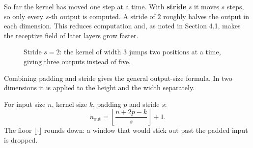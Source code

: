 \documentclass[12pt, a4paper]{article}
\newcommand{\drawgrid}[3]{%
  \begin{scope}[shift={#1}]
    \foreach \row [count=\r] in {#3} {
        \foreach \v [count=\c] in \row {
            \draw[gray!70, fill=#2] (\c-1,-\r+1) rectangle ++(1,-1);
            \node[font=\small] at (\c-0.5,-\r+0.5) {$\v$};
          }
      }
  \end{scope}%
}
\begin{document}
So far the kernel has moved one step at a time. With \textbf{stride} $s$ it
moves $s$ steps, so only every $s$-th output is computed. A stride of $2$
roughly halves the output in each dimension. This reduces computation and,
as noted in Section 4.1, makes the receptive field of later layers grow
faster.

\begin{figure}[H]
  \centering
  \caption{Stride $s = 2$: the kernel of width $3$ jumps two positions at a
    time, giving three outputs instead of five.}
  \label{fig:stride}
\end{figure}

Combining padding and stride gives the general output-size formula. In two
dimensions it is applied to the height and the width separately.

\begin{resultbox}
  For input size $n$, kernel size $k$, padding $p$ and stride $s$:
  \[
    n_{\text{out}} = \left\lfloor \frac{n + 2p - k}{s} \right\rfloor + 1 .
  \]
  The floor $\lfloor\cdot\rfloor$ rounds down: a window that would stick out
  past the padded input is dropped.
\end{resultbox}
\end{document}
